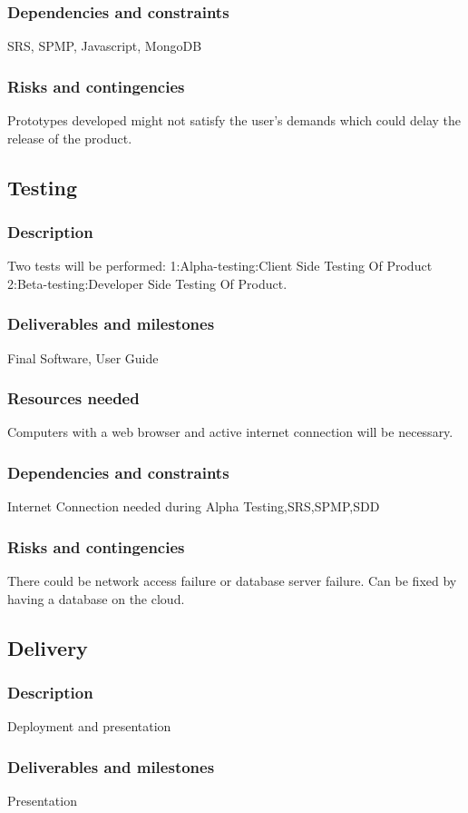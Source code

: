\documentclass[12pt, letterpaper, twoside]{report}
\begin{document}
\subsubsection{Dependencies and constraints}
SRS, SPMP, Javascript, MongoDB
\subsubsection{Risks and contingencies}
Prototypes developed might not satisfy the user's demands which could delay the release of the product. 

\subsection{Testing}
\subsubsection{Description}
Two tests will be performed: 1:Alpha-testing:Client Side Testing Of Product 2:Beta-testing:Developer Side Testing Of Product.
\subsubsection{Deliverables and milestones}
Final Software, User Guide
\subsubsection{Resources needed}
Computers with a web browser and active internet connection will be necessary.
\subsubsection{Dependencies and constraints}
Internet Connection needed during Alpha Testing,SRS,SPMP,SDD
\subsubsection{Risks and contingencies}
There could be network access failure or database server failure. Can be fixed by having a database on the cloud.
\subsection{Delivery}
\subsubsection{Description}
Deployment and presentation
\subsubsection{Deliverables and milestones}
Presentation
\end{document}
